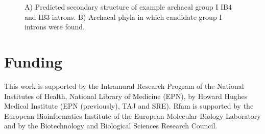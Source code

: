 \documentclass[custom,landscape,final,30pt,plainboxedsections]{sciposter-titleskipsmall}
\begin{document}
\begin{multicols}{3}
\begin{footnotesize}
\begin{figure}
\caption{A) Predicted secondary structure of example archaeal group I
  IB4 and IB3 introns. B) Archaeal phyla in which candidate group I
  introns were found.}
\label{fig:gp1}
\end{figure}
\end{footnotesize}

\section*{Funding}
\begin{flushleft}
\begin{scriptsize}
This work is supported by the Intramural Research Program of the
National Institutes of Health, National Library of Medicine (EPN), 
by Howard Hughes Medical Institute (EPN (previously), TAJ and
SRE). Rfam is supported by the European
Bioinformatics Institute of the European Molecular Biology Laboratory
and by the Biotechnology and Biological Sciences Research Council.
\end{scriptsize}
\end{flushleft}


\begin{tiny}

\end{tiny}

\end{multicols}
\end{document}
